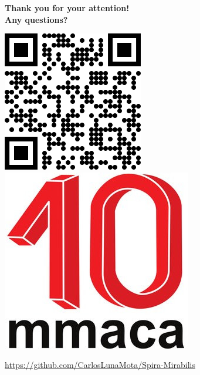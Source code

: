 \documentclass[14pt]{beamer}
\begin{document}
    \begin{frame}{}
        \begin{center}
            \textbf{\Large Thank you for your attention!\\[1ex]Any questions?}

            \bigskip \bigskip

            \href{https://github.com/CarlosLunaMota/Spira-Mirabilis}{\includegraphics[height=16ex]{pictures/QR.png}} \qquad \quad \href{https://mmaca.cat/}{\includegraphics[height=16ex]{pictures/MMACA_10.jpeg}}

            \bigskip \bigskip
            
            \href{https://github.com/CarlosLunaMota/Spira-Mirabilis}{https://github.com/CarlosLunaMota/Spira-Mirabilis}
        \end{center}
    \end{frame}
    
\end{document}
